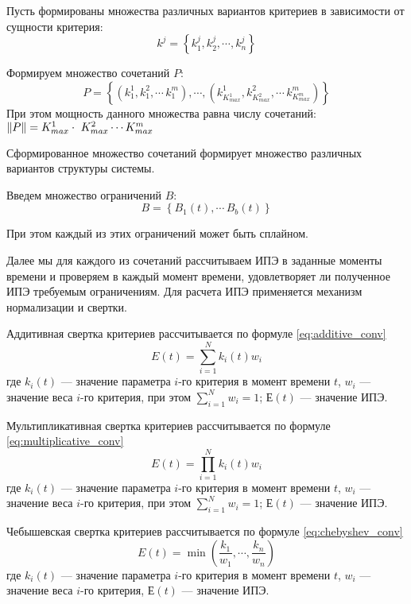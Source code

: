 Пусть формированы множества различных вариантов критериев в зависимости от сущности критерия:
\begin{equation}
    k^j=\left\{ k_1^j,k_2^j, \cdots ,k_n^j \right\}
\end{equation}

Формируем множество сочетаний $P$: 
\begin{equation}
    P=\left\{ (k^1_1, k^2_1, \cdots\, k^m_1), \cdots , (k^1_{K^1_{max}}, k^2_{K^2_{max}}, \cdots\, k^m_{K^m_{max}}) \right\}
\end{equation}
При этом мощность данного множества равна числу сочетаний: $ \norm{P} = K^1_{max} \cdot \ K^2_{max} \cdots  K^m_{max} $

Сформированное множество сочетаний формирует множество различных вариантов структуры системы.

Введем множество ограничений $B$:
\begin{equation}
    B = \left\{ B_1(t),\cdots\, B_b(t) \right\} 
\end{equation}

При этом каждый из этих ограничений может быть сплайном.

Далее мы для каждого из сочетаний рассчитываем ИПЭ в заданные моменты времени и проверяем в каждый момент времени, удовлетворяет ли полученное ИПЭ требуемым ограничениям.
Для расчета ИПЭ применяется механизм нормализации и свертки.

Аддитивная свертка критериев рассчитывается по формуле \ref{eq:additive_conv}
\begin{equation}
    \label{eq:additive_conv}
    E(t) = \sum^N_{i=1} k_i(t) w_i
\end{equation}
где $k_i(t)$ --- значение параметра $i$-го критерия в момент времени $t$,
$w_i$ --- значение веса $i$-го критерия, при этом $\sum^N_{i=1} w_i = 1$; 
$Е(t)$ --- значение ИПЭ.

Мультипликативная свертка критериев рассчитывается по формуле \ref{eq:multiplicative_conv}
\begin{equation}
    \label{eq:multiplicative_conv}
    E(t) = \prod^N_{i=1} k_i(t) w_i 
\end{equation}
где $k_i(t)$ --- значение параметра $i$-го критерия в момент времени $t$,
$w_i$ --- значение веса $i$-го критерия, при этом $\sum^N_{i=1} w_i = 1$; 
$Е(t)$ --- значение ИПЭ.

Чебышевская свертка критериев рассчитывается по формуле \ref{eq:chebyshev_conv}
\begin{equation}
    \label{eq:chebyshev_conv}
    E(t) = \min(\frac{k_1}{w_1}, \cdots, \frac{k_n}{w_n})
\end{equation}
где $k_i(t)$ --- значение параметра $i$-го критерия в момент времени $t$,
$w_i$ --- значение веса $i$-го критерия,
$Е(t)$ --- значение ИПЭ.

